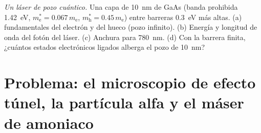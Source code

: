 \begin{exercise}[$\star\star\star$]\label{exo:b2:potential-wells-tunneling:12}
\emph{Un láser de pozo cuántico.} Una capa de \qty{10}{nm} de GaAs (banda prohibida
\qty{1.42}{eV}, $m_{\text{e}}^* = 0.067\,m_{\text{e}}$, $m_{\text{h}}^* = 0.45\,m_{\text{e}}$)
entre barreras \qty{0.3}{eV} más altas. (a)  fundamentales
del electrón y del hueco (pozo infinito). (b) Energía y longitud de onda del fotón
del láser. (c) Anchura para \qty{780}{nm}. (d) Con la barrera finita,
¿cuántos estados electrónicos ligados alberga el pozo de \qty{10}{nm}?
\end{exercise}

\section{Problema: el microscopio de efecto túnel, la partícula alfa y el máser de amoniaco}


